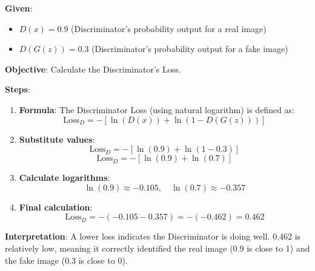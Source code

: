 \documentclass[11pt,a4paper]{article}
\begin{document}
\begin{tcolorbox}[colback=blue!5!white,colframe=blue!75!black,title=\textbf{Worked Example 12: Discriminator Loss Calculation}]
\textbf{Given}:
\begin{itemize}
    \item $D(x) = 0.9$ (Discriminator's probability output for a real image)
    \item $D(G(z)) = 0.3$ (Discriminator's probability output for a fake image)
\end{itemize}

\textbf{Objective}: Calculate the Discriminator's Loss.

\textbf{Steps}:
\begin{enumerate}
    \item \textbf{Formula}: The Discriminator Loss (using natural logarithm) is defined as:
    \[ \text{Loss}_D = - [ \ln(D(x)) + \ln(1 - D(G(z))) ] \]
    \item \textbf{Substitute values}:
    \[ \text{Loss}_D = - [ \ln(0.9) + \ln(1 - 0.3) ] \]
    \[ \text{Loss}_D = - [ \ln(0.9) + \ln(0.7) ] \]
    \item \textbf{Calculate logarithms}:
    \[ \ln(0.9) \approx -0.105, \quad \ln(0.7) \approx -0.357 \]
    \item \textbf{Final calculation}:
    \[ \text{Loss}_D = - ( -0.105 - 0.357 ) = - ( -0.462 ) = 0.462 \]
\end{enumerate}
\textbf{Interpretation}: A lower loss indicates the Discriminator is doing well. 0.462 is relatively low, meaning it correctly identified the real image (0.9 is close to 1) and the fake image (0.3 is close to 0).
\end{tcolorbox}

\vspace{1em}
\end{document}
